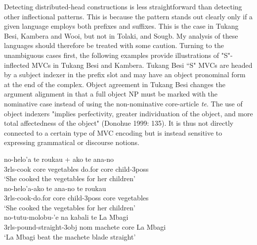 Detecting distributed-head constructions is less straightforward than detecting other inflectional patterns. This is because the pattern stands out clearly only if a given language employs both prefixes and suffixes. This is the case in Tukang Besi, Kambera and Wooi, but not in Tolaki, and Sougb. My analysis of these languages should therefore be treated with some caution. Turning to the unambiguous cases first, the following examples provide illustrations of "S"-inflected MVCs in Tukang Besi and Kambera. Tukang Besi ``S" MVCs are headed by a subject indexer in the prefix slot and may have an object pronominal form at the end of the complex. Object agreement in Tukang Besi changes the argument alignment in that a full object NP must be marked with the nominative case instead of using the non-nominative core-article \textit{te}. The use of object indexers "implies perfectivity, greater individuation of the object, and more total affectedness of the object" (Donohue 1999: 135). It is thus not directly connected to a certain type of MVC encoding but is instead sensitive to expressing grammatical or discourse notions.

\pex \label{tukang001}
\a
\gll no-helo'a te roukau + ako te ana-no \\
3\acs{rls}-cook \acs{core} vegetables do.for \acs{core} child-3\acs{poss} \\
\glft `She cooked the vegetables for her children' \\ 
\z
\a \label{tukang001b}
\gll no-helo'a-ako te ana-no te roukau \\ 
3\acs{rls}-cook-do.for \acs{core} child-3\acs{poss} \acs{core} vegetables \\
\glft `She cooked the vegetables for her children' \\ 
\z
\xe
\ea \label{tukang002}
\gll no-tutu-molobu-'e na kabali te La Mbagi \\
3\acs{rls}-pound-straight-3\acs{obj} \acs{nom} machete \acs{core} La Mbagi \\
\glft `La Mbagi beat the machete blade straight' \\ 
\z
\xe

